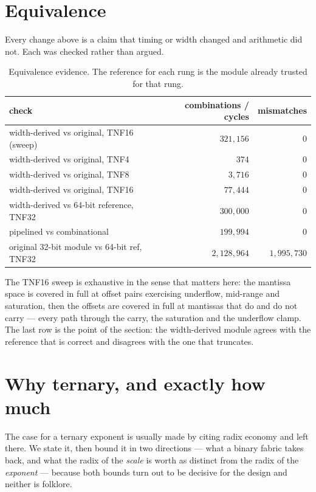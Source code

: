 \documentclass[11pt]{article}
\theoremstyle{definition}
\begin{document}
\section{Equivalence}\label{sec:equiv}

Every change above is a claim that timing or width changed and arithmetic did
not. Each was checked rather than argued.

\begin{table}[t]\centering
\caption{Equivalence evidence. The reference for each rung is the module already
trusted for that rung.}
\label{tab:equiv}
\begin{tabular}{lrr}
\toprule
check & combinations / cycles & mismatches \\
\midrule
width-derived vs original, TNF16 (sweep)      & $321{,}156$   & $0$ \\
width-derived vs original, TNF4               & $374$         & $0$ \\
width-derived vs original, TNF8               & $3{,}716$     & $0$ \\
width-derived vs original, TNF16              & $77{,}444$    & $0$ \\
width-derived vs 64-bit reference, TNF32      & $300{,}000$   & $0$ \\
pipelined vs combinational                     & $199{,}994$   & $0$ \\
\midrule
original 32-bit module vs 64-bit ref, TNF32   & $2{,}128{,}964$ & $1{,}995{,}730$ \\
\bottomrule
\end{tabular}
\end{table}

The TNF16 sweep is exhaustive in the sense that matters here: the mantissa space
is covered in full at offset pairs exercising underflow, mid-range and
saturation, then the offsets are covered in full at mantissas that do and do not
carry --- every path through the carry, the saturation and the underflow clamp.
The last row is the point of the section: the width-derived module agrees with
the reference that is correct and disagrees with the one that truncates.


\section{Why ternary, and exactly how much}\label{sec:whyternary}

The case for a ternary exponent is usually made by citing radix economy and left
there. We state it, then bound it in two directions --- what a binary fabric takes
back, and what the radix of the \emph{scale} is worth as distinct from the radix
of the \emph{exponent} --- because both bounds turn out to be decisive for the
design and neither is folklore.
\end{document}
